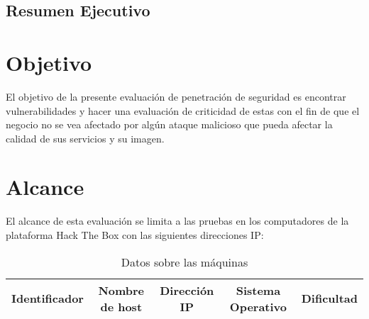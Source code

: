 \documentclass[a4paper]{article}
\begin{document}
    
    \clearpage
        \tableofcontents
    \clearpage
    \listoffigures
    \clearpage
    \cfoot{\thepage}
    \setcounter{page}{1}
    \begin{center}
        \section*{Resumen Ejecutivo}
    \end{center}
    \vspace{0.1cm}

    \clearpage
    \section{Objetivo}
        \large{El objetivo de la presente evaluación de penetración de seguridad es encontrar vulnerabilidades y hacer una evaluación de criticidad de estas con el fin de que el negocio no se vea afectado por algún ataque malicioso que pueda afectar la calidad de sus servicios y su imagen.}
        \par
    \section{Alcance}
        \large{El alcance de esta evaluación se limita a las pruebas en los computadores de la plataforma Hack The Box con las siguientes direcciones IP:}
        \par
        \begin{table}[h]
            \centering
                \begin{tabular}{|c|c|c|c|c|} \hline
                    Identificador & Nombre de host & Dirección IP & Sistema Operativo & Dificultad \\ \hline
                    
                \end{tabular}
                \caption{Datos sobre las máquinas}
        \end{table}
        \par
\end{document}
